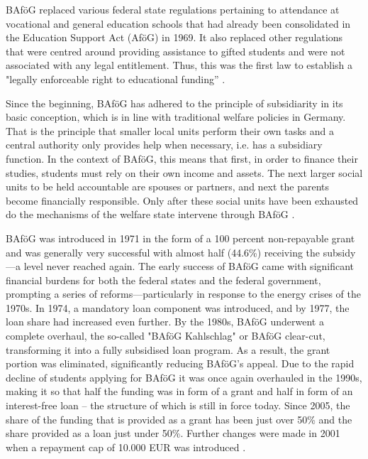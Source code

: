 BAföG replaced various federal state regulations pertaining to attendance at vocational and general education schools that had already been consolidated in the Education Support Act (AföG) in 1969. It also replaced other regulations that were centred around providing assistance to gifted students and were not associated with any legal entitlement. Thus, this was the first law to establish a "legally enforceable right to educational funding” \citep{staack_von_2017}.

Since the beginning, BAföG has adhered to the principle of subsidiarity in its basic conception, which is in line with traditional welfare policies in Germany. That is the principle that smaller local units perform their own tasks and a central authority only provides help when necessary, i.e. has a subsidiary function. In the context of BAföG, this means that first, in order to finance their studies, students must rely on their own income and assets. The next larger social units to be held accountable are spouses or partners, and next the parents become financially responsible. Only after these social units have been exhausted do the mechanisms of the welfare state intervene through BAföG \citep{staack_von_2017}.

BAföG was introduced in 1971 in the form of a 100 percent non-repayable grant and was generally very successful with almost half (44.6\%) receiving the subsidy---a level never reached again. 
The early success of BAföG came with significant financial burdens for both the federal states and the federal government, prompting a series of reforms—particularly in response to the energy crises of the 1970s. In 1974, a mandatory loan component was introduced, and by 1977, the loan share had increased even further. By the 1980s, BAföG underwent a complete overhaul, the so-called "BAföG Kahlschlag" or BAföG clear-cut, transforming it into a fully subsidised loan program. As a result, the grant portion was eliminated, significantly reducing BAföG's appeal. Due to the rapid decline of students applying for BAföG it was once again overhauled in the 1990s, making it so that half the funding was in form of a grant and half in form of an interest-free loan -- the structure of which is still in force today. Since 2005, the share of the funding that is provided as a grant has been just over 50\% and the share provided as a loan just under 50\%. Further changes were made in 2001 when a repayment cap of 10.000 EUR was introduced  \citep{lost_geschichte_2025, staack_von_2017, meier_bafog_2024}.

